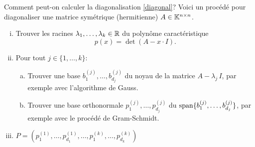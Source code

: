 Comment peut-on calculer la diagonalisation \eqref{diagonal}? Voici un procédé pour diagonaliser une matrice symétrique (hermitienne) $A \in \mathbb{K}^{n \times n}$. 

\begin{enumerate}[i)] 
\item Trouver les racines $\lambda_1,\dots,\lambda_k \in \mathbb{R}$ du polynôme caractéristique 
  \begin{displaymath}
    p(x) = \det(A - x\cdot I). 
  \end{displaymath}
\item Pour tout $j \in \{1,\dots,k\}$:
  \begin{enumerate}[a)] 
  \item Trouver une base $b^{(j)}_1,\dots,b^{(j)}_{d_j}$ du noyau de la matrice $A - \lambda_j \, I$, par exemple avec l'algorithme de Gauss. 
  \item Trouver une base orthonormale $p^{(j)}_1,\dots,p^{(j)}_{d_j}$ du $\operatorname{span}\{b^{(j)}_1,\dots,b^{(j)}_{d_j}\}$, par exemple avec le procédé de Gram-Schmidt. 
  \end{enumerate}
  \item $P = \left(p^{(1)}_1,\dots,p^{(1)}_{d_1},\dots,p^{(k)}_1,\dots,p^{(k)}_{d_k}\right)$ 
\end{enumerate}




